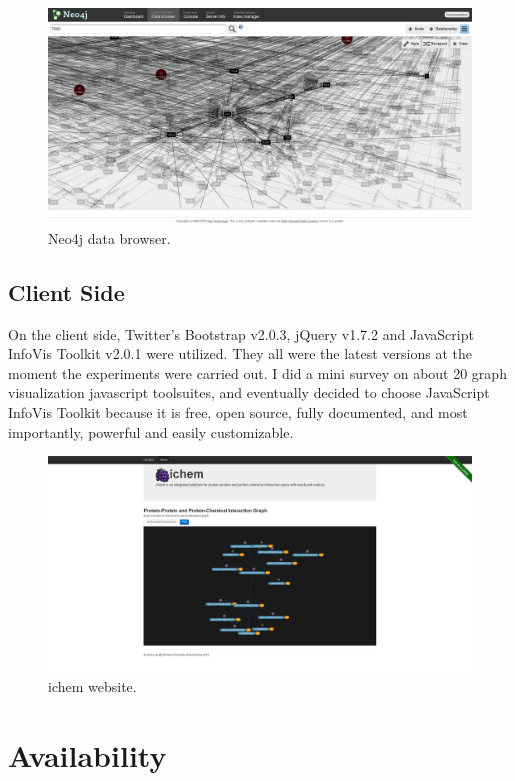 \documentclass[10pt,conference,compsocconf]{../IEEEtran}
\begin{document}
\begin{figure}
\centering
\includegraphics[width=\linewidth]{DataBrowser.png}
\caption{Neo4j data browser.}
\label{fig:DataBrowser}
\end{figure}

\subsection{Client Side}

On the client side, Twitter's Bootstrap v2.0.3, jQuery v1.7.2 and JavaScript InfoVis Toolkit v2.0.1 were utilized. They all were the latest versions at the moment the experiments were carried out. I did a mini survey on about 20 graph visualization javascript toolsuites, and eventually decided to choose JavaScript InfoVis Toolkit because it is free, open source, fully documented, and most importantly, powerful and easily customizable.

\begin{figure}
\centering
\includegraphics[width=\linewidth]{ichem.png}
\caption{ichem website.}
\label{fig:ichem}
\end{figure}

\section{Availability}
\end{document}
